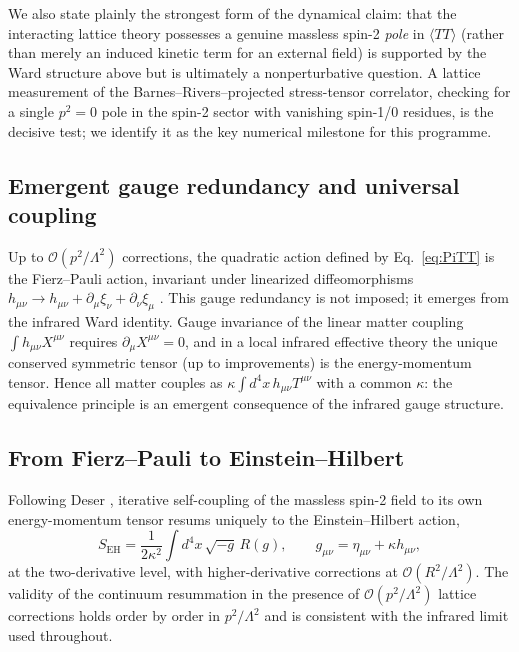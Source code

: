 \documentclass[11pt,a4paper]{article}
\begin{document}
We also state plainly the strongest form of the dynamical claim:
that the interacting lattice theory possesses a genuine massless
spin-2 \emph{pole} in $\langle TT \rangle$ (rather than merely an
induced kinetic term for an external field) is supported by the
Ward structure above but is ultimately a nonperturbative question.
A lattice measurement of the Barnes--Rivers--projected
stress-tensor correlator, checking for a single $p^2 = 0$ pole in
the spin-2 sector with vanishing spin-1/0 residues, is the decisive
test; we identify it as the key numerical milestone for this
programme.

\subsection{Emergent gauge redundancy and universal coupling}

Up to $\mathcal{O}(p^2/\Lambda^2)$ corrections, the quadratic
action defined by Eq.~\eqref{eq:PiTT} is the Fierz--Pauli action,
invariant under linearized diffeomorphisms
$h_{\mu\nu} \to h_{\mu\nu} + \partial_\mu\xi_\nu
+ \partial_\nu\xi_\mu$ \cite{Fierz:1939ix}.
This gauge redundancy is not imposed; it emerges from the infrared
Ward identity.
Gauge invariance of the linear matter coupling
$\int h_{\mu\nu}X^{\mu\nu}$ requires
$\partial_\mu X^{\mu\nu} = 0$, and in a local infrared effective
theory the unique conserved symmetric tensor (up to improvements)
is the energy-momentum tensor.
Hence all matter couples as
$\kappa\int d^4x\,h_{\mu\nu}T^{\mu\nu}$ with a common $\kappa$:
the equivalence principle is an emergent consequence of the
infrared gauge structure.

\subsection{From Fierz--Pauli to Einstein--Hilbert}

Following Deser \cite{Deser:1969wk}, iterative self-coupling of the
massless spin-2 field to its own energy-momentum tensor resums
uniquely to the Einstein--Hilbert action,
\begin{equation}
S_{\mathrm{EH}} = \frac{1}{2\kappa^2}\int d^4x\,
\sqrt{-g}\,R(g),
\qquad
g_{\mu\nu} = \eta_{\mu\nu} + \kappa h_{\mu\nu},
\label{eq:EH}
\end{equation}
at the two-derivative level, with higher-derivative corrections at
$\mathcal{O}(R^2/\Lambda^2)$.
The validity of the continuum resummation in the presence of
$\mathcal{O}(p^2/\Lambda^2)$ lattice corrections holds order by
order in $p^2/\Lambda^2$ and is consistent with the infrared limit
used throughout.
\end{document}
